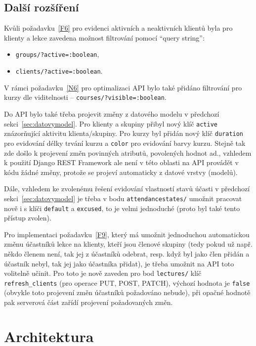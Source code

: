 \subsection{Další rozšíření}

Kvůli požadavku~\ref{F6} pro evidenci aktivních a neaktivních klientů byla pro klienty a lekce zavedena možnost filtrování pomocí \enquote{query string}:
\begin{itemize}
    \item \verb|groups/?active=:boolean|,
    \item \verb|clients/?active=:boolean|.
\end{itemize}

V rámci požadavku~\ref{N6} pro optimalizaci API bylo také přidáno filtrování pro kurzy dle viditelnosti -- \verb|courses/?visible=:boolean|.

Do API bylo také třeba projevit změny z datového modelu v předchozí sekci~\ref{sec:datovymodel}. Pro klienty a skupiny přibyl nový klíč \verb|active| znázorňující aktivitu klienta/skupiny. Pro kurzy byl přidán nový klíč \verb|duration| pro evidování délky trvání kurzu a \verb|color| pro evidování barvy kurzu. Stejně tak zde došlo k projevení změn povinných atributů, povolených hodnot ad., vzhledem k použití Django REST Framework ale není v této oblasti na API provádět v kódu žádné změny, protože se projeví automaticky z datové vrstvy (modelů).

Dále, vzhledem ke zvolenému řešení evidování vlastností stavů účasti v předchozí sekci~\ref{sec:datovymodel} je třeba v bodu \verb|attendancestates/| umožnit pracovat nově i s klíči \verb|default| a \verb|excused|, to je velmi jednoduché (proto byl také tento přístup zvolen).

Pro implementaci požadavku~\ref{F9}, který má umožnit jednoduchou automatickou změnu účastníků lekce na klienty, kteří jsou členové skupiny (tedy pokud už např. někdo členem není, tak jej z účastníků odebrat, resp. když byl jako člen přidán a účastník nebyl, tak jej jako účastníka přidat), je třeba umožnit na API toto volitelně učinit. Pro toto je nově zaveden pro bod \verb|lectures/| klíč \verb|refresh_clients| (pro operace PUT, POST, PATCH), výchozí hodnota je \verb|false| (obvykle toto projevení změn účastníků požadováno nebude), při opačné hodnotě pak serverová část zařídí projevení požadovaných změn. 

\section{Architektura}

